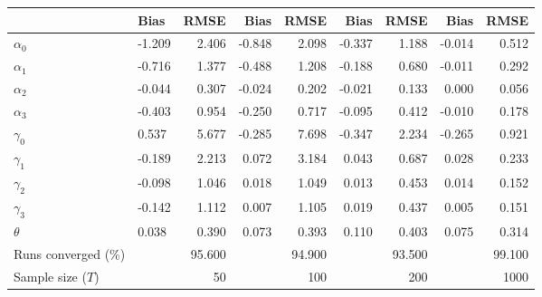 
\begin{tabular}[t]{llrrrrrrr}
\toprule
  & Bias & RMSE & Bias & RMSE & Bias & RMSE & Bias & RMSE\\
\midrule
$\alpha_{0}$ & -1.209 & 2.406 & -0.848 & 2.098 & -0.337 & 1.188 & -0.014 & 0.512\\
$\alpha_{1}$ & -0.716 & 1.377 & -0.488 & 1.208 & -0.188 & 0.680 & -0.011 & 0.292\\
$\alpha_{2}$ & -0.044 & 0.307 & -0.024 & 0.202 & -0.021 & 0.133 & 0.000 & 0.056\\
$\alpha_{3}$ & -0.403 & 0.954 & -0.250 & 0.717 & -0.095 & 0.412 & -0.010 & 0.178\\
$\gamma_{0}$ & 0.537 & 5.677 & -0.285 & 7.698 & -0.347 & 2.234 & -0.265 & 0.921\\
$\gamma_{1}$ & -0.189 & 2.213 & 0.072 & 3.184 & 0.043 & 0.687 & 0.028 & 0.233\\
$\gamma_{2}$ & -0.098 & 1.046 & 0.018 & 1.049 & 0.013 & 0.453 & 0.014 & 0.152\\
$\gamma_{3}$ & -0.142 & 1.112 & 0.007 & 1.105 & 0.019 & 0.437 & 0.005 & 0.151\\
$\theta$ & 0.038 & 0.390 & 0.073 & 0.393 & 0.110 & 0.403 & 0.075 & 0.314\\
Runs converged (\%) &  & 95.600 &  & 94.900 &  & 93.500 &  & 99.100\\
Sample size ($T$) &  & 50 &  & 100 &  & 200 &  & 1000\\
\bottomrule
\end{tabular}

